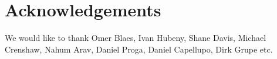 \documentclass[preprint, a4paper, 11pt]{aastex}
\begin{document}
\section*{Acknowledgements}

We would like to thank Omer Blaes, Ivan Hubeny, Shane Davis, 
Michael Crenshaw, Nahum Arav, Daniel Proga, Daniel Capellupo, Dirk Grupe etc.




\newpage
\end{document}
